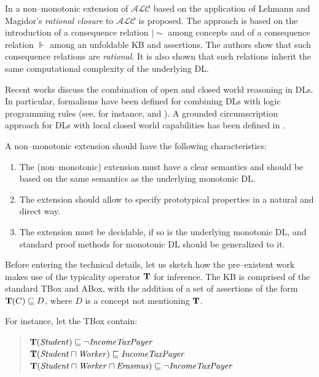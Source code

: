 \documentclass[a4paper, 11pt, oneside]{duthesis}
\newcommand {\ent} {\mathrel{{\scriptstyle\mid\!\sim}}}
\newcommand{\tip}{{\bf T}}
\newcommand{\sqset}{\sqsubseteq}
\newcommand{\mint}{\sqcap}
\begin{document}
In \cite{casinistraccia2010,stracciaijcai2011} a non--monotonic extension of $\mathcal{ALC}$  based on the application of Lehmann and Magidor's \emph{rational closure} \cite{whatdoes} to $\mathcal{ALC}$ is proposed. The approach is based on the introduction of a consequence relation $\ent$ among concepts and of a consequence relation $\Vdash$ among an unfoldable KB and assertions. The authors show that such consequence relations are \emph{rational}. It is also shown that such relations inherit the same computational complexity of the underlying DL.

Recent works discuss the combination of open and closed world reasoning in DLs. In particular, formalisms have been defined for combining DLs with logic programming rules (see, for instance, \cite{eiter2004} and \cite{rosatiacm}). A grounded circumscription approach for DLs with local closed world capabilities has been defined in \cite{hitzlerdl}.

A non--monotonic extension should have the following characteristics:

\begin{enumerate}
\item The (non--monotonic) extension must have a clear semantics and should be based on the same semantics as the underlying monotonic DL.
\item The extension should allow to specify prototypical properties in a natural and direct way.
\item The extension must be decidable, if  so is the underlying monotonic DL, and standard proof methods for monotonic DL should be generalized to it.
\end{enumerate}


Before entering the technical details, let us sketch how the pre--existent work makes use of the typicality operator $\tip$ for inference. The KB is comprised of the standard TBox and ABox, with the addition of a set of assertions of the form $\tip(C)\sqsubseteq D$, where $D$ is a concept not mentioning $\tip$.

For instance, let the TBox contain:

\begin{quote}
$\tip (\mathit{Student}) \sqset \mathit{\neg IncomeTaxPayer}$\\
$\tip (\mathit{Student} \mint \mathit{Worker})  \sqset \mathit{IncomeTaxPayer}$\\
$\tip (\mathit{Student} \mint \mathit{Worker} \mint \mathit{Erasmus})  \sqset \mathit{\neg IncomeTaxPayer}$
\end{quote}
\end{document}
